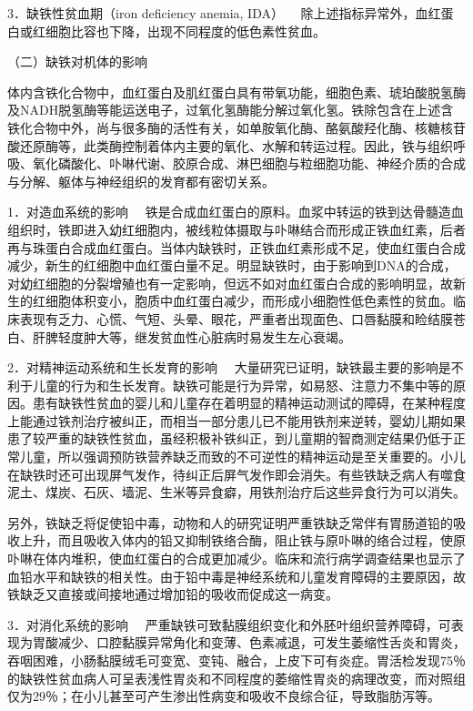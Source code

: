 {3．缺铁性贫血期（iron deficiency anemia, IDA）}
　除上述指标异常外，血红蛋白或红细胞比容也下降，出现不同程度的低色素性贫血。

（二）缺铁对机体的影响

体内含铁化合物中，血红蛋白及肌红蛋白具有带氧功能，细胞色素、琥珀酸脱氢酶及NADH脱氢酶等能运送电子，过氧化氢酶能分解过氧化氢。铁除包含在上述含铁化合物中外，尚与很多酶的活性有关，如单胺氧化酶、酪氨酸羟化酶、核糖核苷酸还原酶等，此类酶控制着体内主要的氧化、水解和转运过程。因此，铁与组织呼吸、氧化磷酸化、卟啉代谢、胶原合成、淋巴细胞与粒细胞功能、神经介质的合成与分解、躯体与神经组织的发育都有密切关系。

{1．对造血系统的影响}
　铁是合成血红蛋白的原料。血浆中转运的铁到达骨髓造血组织时，铁即进入幼红细胞内，被线粒体摄取与卟啉结合而形成正铁血红素，后者再与珠蛋白合成血红蛋白。当体内缺铁时，正铁血红素形成不足，使血红蛋白合成减少，新生的红细胞中血红蛋白量不足。明显缺铁时，由于影响到DNA的合成，对幼红细胞的分裂增殖也有一定影响，但远不如对血红蛋白合成的影响明显，故新生的红细胞体积变小，胞质中血红蛋白减少，而形成小细胞性低色素性的贫血。临床表现有乏力、心慌、气短、头晕、眼花，严重者出现面色、口唇黏膜和睑结膜苍白、肝脾轻度肿大等，继发贫血性心脏病时易发生左心衰竭。

{2．对精神运动系统和生长发育的影响}
　大量研究已证明，缺铁最主要的影响是不利于儿童的行为和生长发育。缺铁可能是行为异常，如易怒、注意力不集中等的原因。患有缺铁性贫血的婴儿和儿童存在着明显的精神运动测试的障碍，在某种程度上能通过铁剂治疗被纠正，而相当一部分患儿已不能用铁剂来逆转，婴幼儿期如果患了较严重的缺铁性贫血，虽经积极补铁纠正，到儿童期的智商测定结果仍低于正常儿童，所以强调预防铁营养缺乏而致的不可逆性的精神运动是至关重要的。小儿在缺铁时还可出现屏气发作，待纠正后屏气发作即会消失。有些铁缺乏病人有噬食泥土、煤炭、石灰、墙泥、生米等异食癖，用铁剂治疗后这些异食行为可以消失。

另外，铁缺乏将促使铅中毒，动物和人的研究证明严重铁缺乏常伴有胃肠道铅的吸收上升，而且吸收入体内的铅又抑制铁络合酶，阻止铁与原卟啉的络合过程，使原卟啉在体内堆积，使血红蛋白的合成更加减少。临床和流行病学调查结果也显示了血铅水平和缺铁的相关性。由于铅中毒是神经系统和儿童发育障碍的主要原因，故铁缺乏又直接或间接地通过增加铅的吸收而促成这一病变。

{3．对消化系统的影响}
　严重缺铁可致黏膜组织变化和外胚叶组织营养障碍，可表现为胃酸减少、口腔黏膜异常角化和变薄、色素减退，可发生萎缩性舌炎和胃炎，吞咽困难，小肠黏膜绒毛可变宽、变钝、融合，上皮下可有炎症。胃活检发现75％的缺铁性贫血病人可呈表浅性胃炎和不同程度的萎缩性胃炎的病理改变，而对照组仅为29％；在小儿甚至可产生渗出性病变和吸收不良综合征，导致脂肪泻等。

